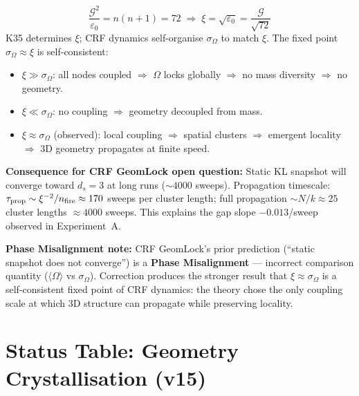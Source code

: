 \documentclass[12pt, a4paper]{article}
\begin{document}
\begin{formalbox}[title={Experiment C: $\xi\approx\sigma_\Omega$ — CRF Operates at the Coupling Threshold (Confirmed)}]
\begin{derivedbox}[title={Revised K35 Interpretation: CRF at the Coupling Threshold}]
\[
  \frac{\mathcal{G}^2}{\varepsilon_0} = n(n+1) = 72 \;\Rightarrow\;
  \xi = \sqrt{\varepsilon_0} = \frac{\mathcal{G}}{\sqrt{72}}
\]
K35 determines $\xi$; CRF dynamics self-organise $\sigma_\Omega$ to match $\xi$.
The fixed point $\sigma_\Omega\approx\xi$ is self-consistent:
\begin{itemize}[noitemsep]
  \item $\xi\gg\sigma_\Omega$: all nodes coupled $\Rightarrow$ $\Omega$ locks globally $\Rightarrow$ no mass diversity $\Rightarrow$ no geometry.
  \item $\xi\ll\sigma_\Omega$: no coupling $\Rightarrow$ geometry decoupled from mass.
  \item $\xi\approx\sigma_\Omega$ (observed): local coupling $\Rightarrow$ spatial clusters $\Rightarrow$ emergent locality $\Rightarrow$ 3D geometry propagates at finite speed.
\end{itemize}
\end{derivedbox}

\textbf{Consequence for CRF GeomLock open question:}
Static KL snapshot will converge toward $d_s=3$ at long runs ($\sim4000$ sweeps).
Propagation timescale: $\tau_{\rm prop}\sim\xi^{-2}/n_{\rm fire}\approx170$ sweeps per cluster length;
full propagation $\sim N/k\approx25$ cluster lengths $\approx4000$ sweeps.
This explains the gap slope $-0.013$/sweep observed in Experiment~A.

\textbf{Phase Misalignment note:} CRF GeomLock's prior prediction (``static snapshot does not converge'') is a \textbf{Phase Misalignment} — incorrect comparison quantity ($\langle\Omega\rangle$ vs $\sigma_\Omega$). Correction produces the stronger result that $\xi\approx\sigma_\Omega$ is a self-consistent fixed point of CRF dynamics: the theory chose the only coupling scale at which 3D structure can propagate while preserving locality.
\end{formalbox}

\section{Status Table: Geometry Crystallisation (v15)}
\end{document}
